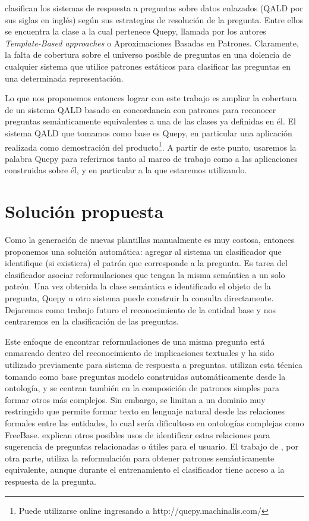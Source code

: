 \citet{ungerQALD} clasifican los sistemas de respuesta a preguntas sobre datos enlazados (QALD por sus siglas en inglés) según sus estrategias de resolución de la pregunta. Entre ellos se encuentra la clase a la cual pertenece Quepy, llamada por los autores \textit{Template-Based approaches} o Aproximaciones Basadas en Patrones. Claramente, la falta de cobertura sobre el universo posible de preguntas en una dolencia de cualquier sistema que utilice patrones estáticos para clasificar las preguntas en una determinada representación.

Lo que nos proponemos entonces lograr con este trabajo es ampliar la cobertura de un sistema QALD basado en concordancia con patrones para reconocer preguntas semánticamente equivalentes a una de las clases ya definidas en él. El sistema QALD que tomamos como base es Quepy, en particular una aplicación realizada como demostración del producto\footnote{Puede utilizarse online ingresando a http://quepy.machinalis.com/}. A partir de este punto, usaremos la palabra Quepy para referirnos tanto al marco de trabajo como a las aplicaciones construidas sobre él, y en particular a la que estaremos utilizando.

\section{Solución propuesta}

Como la generación de nuevas plantillas manualmente es muy costosa, entonces proponemos una solución automática: agregar al sistema un clasificador que identifique (si existiera) el patrón que corresponde a la pregunta. Es tarea del clasificador asociar reformulaciones que tengan la misma semántica a un solo patrón. Una vez obtenida la clase semántica e identificado el objeto de la pregunta, Quepy u otro sistema puede construir la consulta directamente. Dejaremos como trabajo futuro el reconocimiento de la entidad base y nos centraremos en la clasificación de las preguntas.

Este enfoque de encontrar reformulaciones de una misma pregunta está enmarcado dentro del reconocimiento de implicaciones textuales y ha sido utilizado previamente para sistema de respuesta a preguntas. \citet{ou_entailement} utilizan esta técnica tomando como base preguntas modelo construidas automáticamente desde la ontología, y se centran también en la composición de patrones simples para formar otros más complejos. Sin embargo, se limitan a un dominio muy restringido que permite formar texto en lenguaje natural desde las relaciones formales entre las entidades, lo cual sería dificultoso en ontologías complejas como FreeBase. \citet{rui_relations} explican otros posibles usos de identificar estas relaciones para sugerencia de preguntas relacionadas o útiles para el usuario. El trabajo de \citet{Kosseimmuyparecido}, por otra parte, utiliza la reformulación para obtener patrones semánticamente equivalente, aunque durante el entrenamiento el clasificador tiene acceso a la respuesta de la pregunta.

